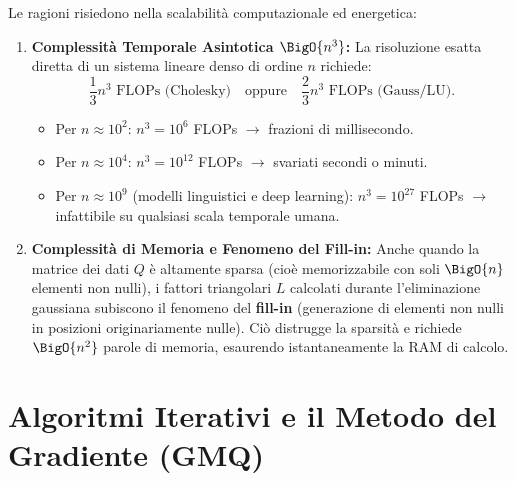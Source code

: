 Le ragioni risiedono nella scalabilit\`a computazionale ed energetica:
\begin{enumerate}
    \item \textbf{Complessit\`a Temporale Asintotica $\BigO{n^3}$:}
    La risoluzione esatta diretta di un sistema lineare denso di ordine $n$ richiede:
    \begin{equation}
        \frac{1}{3} n^3 \text{ FLOPs (Cholesky)} \quad \text{oppure} \quad \frac{2}{3} n^3 \text{ FLOPs (Gauss/LU)}.
    \end{equation}
    \begin{itemize}
        \item Per $n \approx 10^2$: $n^3 = 10^6$ FLOPs $\longrightarrow$ frazioni di millisecondo.
        \item Per $n \approx 10^4$: $n^3 = 10^{12}$ FLOPs $\longrightarrow$ svariati secondi o minuti.
        \item Per $n \approx 10^9$ (modelli linguistici e deep learning): $n^3 = 10^{27}$ FLOPs $\longrightarrow$ infattibile su qualsiasi scala temporale umana.
    \end{itemize}

    \item \textbf{Complessit\`a di Memoria e Fenomeno del Fill-in:}
    Anche quando la matrice dei dati $Q$ \`e altamente sparsa (cio\`e memorizzabile con soli $\BigO{n}$ elementi non nulli), i fattori triangolari $L$ calcolati durante l'eliminazione gaussiana subiscono il fenomeno del \textbf{fill-in} (generazione di elementi non nulli in posizioni originariamente nulle). Ci\`o distrugge la sparsit\`a e richiede $\BigO{n^2}$ parole di memoria, esaurendo istantaneamente la RAM di calcolo.
\end{enumerate}


\FloatBarrier
\section{Algoritmi Iterativi e il Metodo del Gradiente (GMQ)}
\label{sec:algoritmi-iterativi-gmq}

